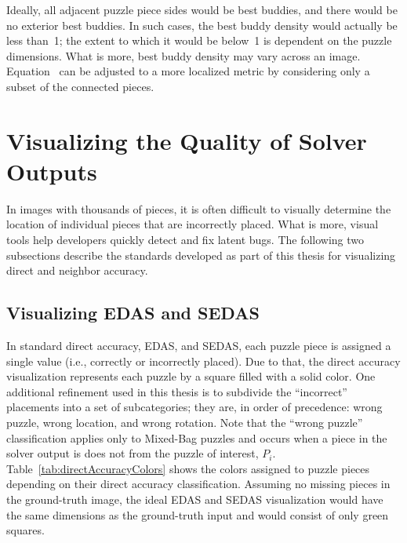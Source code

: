 Ideally, all adjacent puzzle piece sides would be best buddies, and there would be no exterior best buddies. In such cases, the best buddy density would actually be less than~1; the extent to which it would be below~1 is dependent on the puzzle dimensions. What is more, best buddy density may vary across an image. Equation~ can be adjusted to a more localized metric by considering only a subset of the connected pieces.

\section{Visualizing the Quality of Solver Outputs}\label{sec:visualizingSolverAccuracy}

In images with thousands of pieces, it is often difficult to visually determine the location of individual pieces that are incorrectly placed.  What is more, visual tools help developers quickly detect and fix latent bugs.  The following two subsections describe the standards developed as part of this thesis for visualizing direct and neighbor accuracy.

\subsection{Visualizing EDAS and SEDAS}\label{sec:visualizingEdasSedas}

In standard direct accuracy, EDAS, and SEDAS, each puzzle piece is assigned a single value (i.e., correctly or incorrectly placed).  Due to that, the direct accuracy visualization represents each puzzle by a square filled with a solid color.  One additional refinement used in this thesis is to subdivide the ``incorrect'' placements into a set of subcategories; they are, in order of precedence: wrong puzzle, wrong location, and wrong rotation.  Note that the ``wrong puzzle'' classification applies only to Mixed-Bag puzzles and occurs when a piece in the solver output is does not from the puzzle of interest, $P_i$.  Table~\ref{tab:directAccuracyColors} shows the colors assigned to puzzle pieces depending on their direct accuracy classification.  Assuming no missing pieces in the ground-truth image, the ideal EDAS and SEDAS visualization would have the same dimensions as the ground-truth input and would consist of only green squares.

